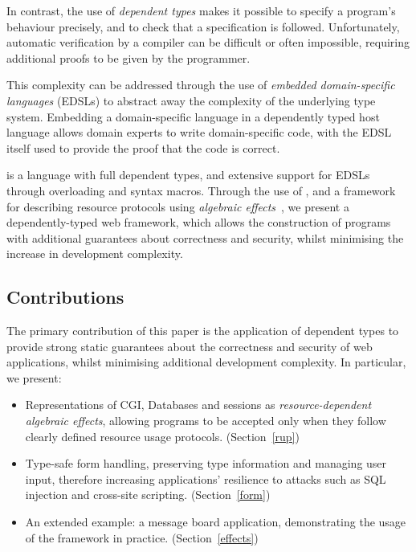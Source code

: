 In contrast, the use of \textit{dependent types} makes it possible
to specify a program's behaviour precisely, and to check that a 
specification is followed.
%
Unfortunately, automatic verification by a compiler can be difficult or
often impossible, requiring additional proofs to be given by the programmer.

This complexity can be addressed through the use of \textit{embedded
domain-specific languages} (EDSLs) to abstract away the complexity of the
underlying type system. Embedding a domain-specific language in
a dependently typed host language
allows domain experts to write 
domain-specific code, with the EDSL itself used to provide the proof that the
code is correct.

\idris{} \cite{brady2013idris} is a language with full dependent types, and
extensive support for EDSLs through overloading and syntax macros. Through the
use of \idris{}, and a framework for describing resource protocols using
\emph{algebraic effects}~\cite{brady:effects}, we
present a dependently-typed web framework, which allows the construction of
programs with additional guarantees about correctness and security, whilst
minimising the increase in development complexity. 

\subsection{Contributions}
The primary contribution of this paper is the application of 
dependent types to provide strong static guarantees
about the correctness and security of web applications, whilst minimising
additional development complexity. In particular, we present:

\begin{itemize}
\item Representations of CGI, Databases and sessions as
\textit{resource-dependent algebraic effects}, allowing programs to be accepted
only when they follow clearly defined resource usage protocols. 
(Section~\ref{rup})

\item Type-safe form handling, preserving type information and managing
user input, therefore increasing applications' resilience to attacks such as
SQL injection and cross-site scripting. (Section~\ref{form})

\item An extended example: a message board application, demonstrating the usage
of the framework in practice. (Section~\ref{effects})

\end{itemize}

